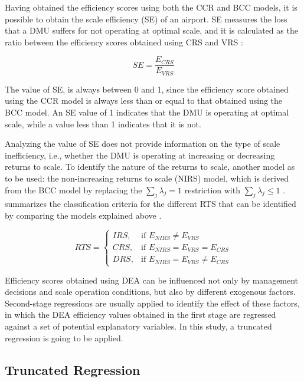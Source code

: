 Having obtained the efficiency scores using both the CCR and BCC models,
it is possible to obtain the scale efficiency (SE) of an airport. SE measures the loss that a DMU suffers
for not operating at optimal scale, and it is calculated as the ratio between the efficiency scores obtained
using CRS and VRS \cite{bogetoft2011}:

\begin{equation}
    \label{eq:scale_efficiency}
SE = \frac{E_{CRS}}{ E_{VRS}}
\end{equation} 

The value of SE, is always between 0 and 1, since the efficiency score obtained using the CCR model is always less than or equal to that obtained using the BCC model. An SE value of 1 indicates that the DMU is operating at optimal scale, while a value less than 1 indicates that it is not.

Analyzing the value of SE does not provide information on the type of scale inefficiency, i.e., whether
the DMU is operating at increasing or decreasing returns to scale. To identify the nature of the returns to
scale, another model as to be used: the non-increasing returns to scale (NIRS) model, which is derived
from the BCC model by replacing the \(\sum_j \lambda_j = 1\) restriction with \(\sum_j \lambda_j \leq 1\) \cite{coelli2005}.  summarizes the classification criteria for the different RTS that can be identified
by comparing the models explained above \cite{huguenin2012}.

\begin{equation}
\label{eq:rts_definition}
RTS =
\begin{cases}
IRS, & \text{if } E_{NIRS} \neq E_{VRS} \\
CRS, & \text{if } E_{NIRS} = E_{VRS} = E_{CRS} \\
DRS, & \text{if } E_{NIRS} = E_{VRS} \neq E_{CRS}
\end{cases}
\end{equation}
 
Efficiency scores obtained using DEA can be influenced not only by management decisions and scale
operation conditions, but also by different exogenous factors. Second-stage regressions are usually
applied to identify the effect of these factors, in which the DEA efficiency values obtained in the first
stage are regressed against a set of potential explanatory variables. In this study, a truncated regression
is going to be applied.

\subsection{Truncated Regression} 
\label{truncreg}

